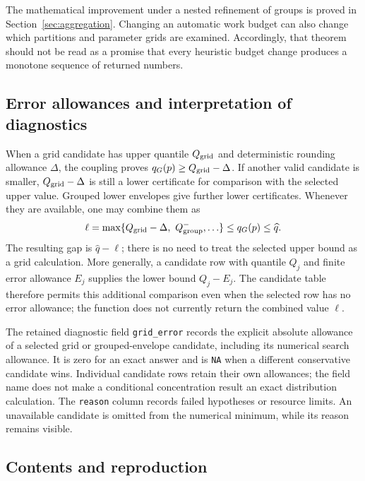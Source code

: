 \documentclass[11pt,letterpaper]{article}
\numberwithin{equation}{section}
\theoremstyle{definition}
\theoremstyle{remark}
\begin{document}
The mathematical improvement under a nested refinement of groups is
proved in Section~\ref{sec:aggregation}. Changing an automatic work budget
can also change which partitions and parameter grids are examined.
Accordingly, that theorem should not be read as a promise that every
heuristic budget change produces a monotone sequence of returned numbers.

\subsection{Error allowances and interpretation of diagnostics}

When a grid candidate has upper quantile $Q_{\rm grid}$ and deterministic
rounding allowance $\Delta$, the coupling proves
$q_G(p)\ge Q_{\rm grid}-\Delta$. If another valid candidate is smaller,
$Q_{\rm grid}-\Delta$ is still a lower certificate for comparison with the
selected upper value. Grouped lower envelopes give further lower
certificates. Whenever they are available, one may combine them as
\[
 \ell=\max\{Q_{\rm grid}-\Delta,\ Q^-_{\rm group},\ldots\}
 \le q_G(p)\le \widehat q.
\]
The resulting gap is $\widehat q-\ell$; there is no need to treat the
selected upper bound as a grid calculation. More generally, a candidate
row with quantile $Q_j$ and finite error allowance $E_j$ supplies the
lower bound $Q_j-E_j$. The candidate table therefore permits this
additional comparison even when the selected row has no error allowance;
the function does not currently return the combined value $\ell$.

The retained diagnostic field \texttt{grid\_error} records the explicit
absolute allowance of a selected grid or grouped-envelope candidate,
including its numerical search allowance. It is zero for an exact answer
and is \texttt{NA} when a different conservative candidate wins. Individual candidate
rows retain their own allowances; the field name does not make a
conditional concentration result an exact distribution calculation.
The \texttt{reason} column records failed hypotheses or resource limits.
An unavailable candidate is omitted from the numerical minimum, while
its reason remains visible.

\subsection{Contents and reproduction}
\end{document}
